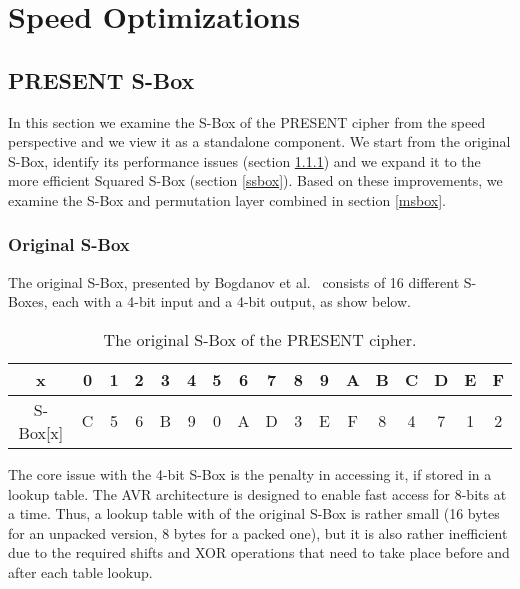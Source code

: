 \documentclass[11pt]{article}
\begin{document}
\maketitle

\section{Speed Optimizations}

\subsection{PRESENT S-Box}\label{sbox}
In this section we examine the S-Box of the PRESENT cipher from the speed perspective and we view it as a standalone component. We start from the original S-Box, identify its performance issues (section \ref{osbox}) and we expand it to the more efficient Squared S-Box (section \ref{ssbox}). Based on these improvements, we examine the S-Box and permutation layer combined  in section \ref{msbox}.
\subsubsection{Original S-Box}\label{osbox}
The original S-Box, presented by Bogdanov et al.~\cite{present} consists of 16 different S-Boxes, each with a 4-bit input and a 4-bit output, as show below.\\
\begin{table}[h]
\centering
\begin{tabular}{| c | c  | c | c | c  | c | c | c  | c | c | c  | c | c | c  | c | c | c |}
\hline
  x & 0 & 1 & 2 & 3 & 4 & 5 & 6 & 7 & 8 & 9 & A & B & C & D & E & F   \\
\hline
  S-Box[x] & C & 5 & 6 & B & 9 & 0 & A & D & 3 & E & F & 8 & 4 & 7 & 1 & 2   \\
\hline
\end{tabular}
 \caption{\small The original S-Box of the PRESENT cipher.}
\end{table}


The core issue with the 4-bit S-Box is the penalty in accessing it, if stored in a lookup table. The AVR architecture is designed to enable fast access for 8-bits at a time. Thus, a lookup table with of the original S-Box is rather small (16 bytes for an unpacked version, 8 bytes for a packed one), but it is also rather inefficient due to the required shifts and XOR operations that need to take place before and after each table lookup.
\end{document}
